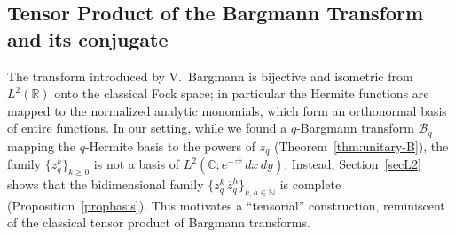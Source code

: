 \documentclass[10pt]{amsart}
\theoremstyle{plain}
\theoremstyle{definition}
\newtheorem{remark}[theorem]{Remark}
\renewcommand{\bar}[1]{\overline{#1}}
\def\ge{\geqslant}
\begin{document}
%
%
%
%
%
%
%

\subsection{Tensor Product of the Bargmann Transform and its conjugate}%
The transform introduced by V.~Bargmann is bijective and isometric from $L^2(\mathbb{R})$ onto the classical Fock space; in particular the Hermite functions are mapped to the normalized analytic monomials, which form an orthonormal basis of entire functions. 
In our setting, while we found a $q$-Bargmann transform $\mathcal{B}_q$ mapping the $q$-Hermite basis to the powers of $z_q$ (Theorem~\ref{thm:unitary-B}), the family $\{z_q^k\}_{k\ge0}$ is not a basis of $L^2(\mathbb C; e^{-z\bar z}\,dx\,dy)$. 
Instead, Section~\ref{secL2} shows that the bidimensional family $\{z_q^k\,\bar z_q^h\}_{k,h\in\mathbb N}$ is complete (Proposition~\ref{propbasis}). 
This motivates a ``tensorial'' construction, reminiscent of the classical tensor product of Bargmann transforms.
\end{document}
